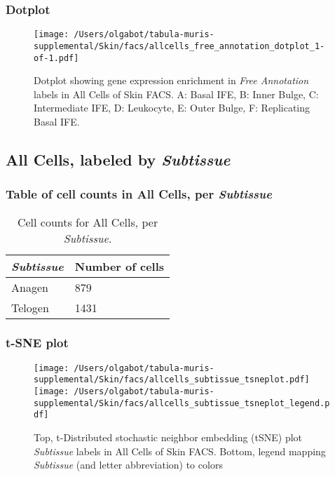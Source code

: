 \clearpage

\subsubsection{Dotplot}
\begin{figure}[h]
\centering
\texttt{[image: /Users/olgabot/tabula-muris-supplemental/Skin/facs/allcells\_free\_annotation\_dotplot\_1-of-1.pdf]}

\caption{ Dotplot  showing gene expression enrichment in \emph{Free Annotation} labels in All Cells of Skin FACS. A: Basal IFE, B: Inner Bulge, C: Intermediate IFE, D: Leukocyte, E: Outer Bulge, F: Replicating Basal IFE.}
\end{figure}


\clearpage

\subsection{All Cells, labeled by \emph{Subtissue}}
\subsubsection{Table of cell counts in All Cells, per \emph{Subtissue}}\begin{table}[h]
\centering
\label{my-label}
\begin{tabular}{@{}ll@{}}
\toprule

\emph{Subtissue}& Number of cells \\ \midrule
Anagen & 879 \\

Telogen & 1431 \\
\bottomrule
\end{tabular}
\caption{Cell counts for All Cells, per \emph{Subtissue}.}
\end{table}

\clearpage
\subsubsection{t-SNE plot}
\begin{figure}[h]
\centering
\texttt{[image: /Users/olgabot/tabula-muris-supplemental/Skin/facs/allcells\_subtissue\_tsneplot.pdf]}
\texttt{[image: /Users/olgabot/tabula-muris-supplemental/Skin/facs/allcells\_subtissue\_tsneplot\_legend.pdf]}
\caption{Top, t-Distributed stochastic neighbor embedding (tSNE) plot  \emph{Subtissue} labels in All Cells of Skin FACS. Bottom, legend mapping \emph{Subtissue} (and letter abbreviation) to colors}
\end{figure}


